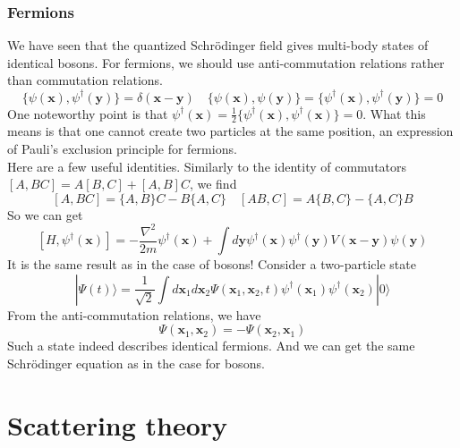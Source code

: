\subsection{Fermions}
We have seen that the quantized Schrödinger field gives multi-body states of identical bosons. For fermions, we should use anti-commutation relations rather than commutation relations.
\[\{\psi(\bm{x}),\psi^{\dagger}(\bm{y})\} = \delta(\bm{x}-\bm{y}) \quad \{\psi(\bm{x}),\psi(\bm{y})\} = \{\psi^{\dagger}(\bm{x}),\psi^{\dagger}(\bm{y})\} = 0\]
One noteworthy point is that $\psi^{\dagger}(\bm{x}) = \frac{1}{2}\{\psi^{\dagger}(\bm{x}),\psi^{\dagger}(\bm{x})\} = 0$. 
What this means is that one cannot create two particles at the same position, an expression of Pauli's exclusion principle for fermions.\\
Here are a few useful identities. Similarly to the identity of commutators $[A,BC] = A[B,C] + [A,B]C$, we find
\[[A,BC] = \{A,B\}C - B\{A,C\} \quad [AB,C] = A\{B,C\} - \{A,C\}B\]
So we can get
\[[H,\psi^{\dagger}(\bm{x})] = -\frac{\nabla^2}{2m}\psi^{\dagger}(\bm{x}) + \int d\bm{y} \psi^{\dagger}(\bm{x}) \psi^{\dagger}(\bm{y})V(\bm{x}-\bm{y})\psi(\bm{y})\]
It is the same result as in the case of bosons!
Consider a two-particle state
\[|\Psi(t)\rangle = \frac{1}{\sqrt{2}} \int d\bm{x}_1 d\bm{x}_2 \Psi(\bm{x}_1,\bm{x}_2,t) \psi^{\dagger}(\bm{x}_1)\psi^{\dagger}(\bm{x}_2) |0\rangle\]
From the anti-commutation relations, we have
\[\Psi(\bm{x}_1,\bm{x}_2) = - \Psi(\bm{x}_2,\bm{x}_1)\]
Such a state indeed describes identical fermions. And we can get the same Schrödinger equation as in the case for bosons.

\chapter{Scattering theory}
